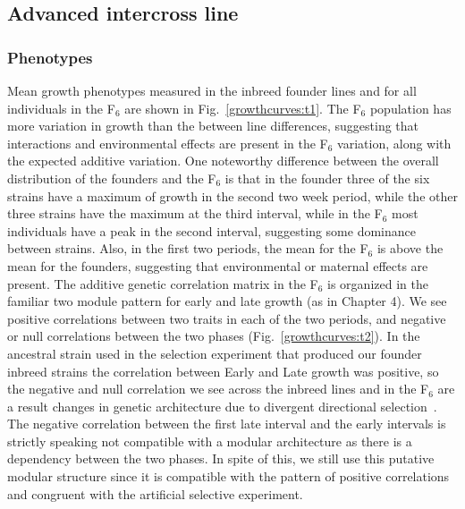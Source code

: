 \begin{refsection}
\subsection{Advanced intercross line}

\subsubsection{Phenotypes}

Mean growth phenotypes measured in the inbreed founder lines and for all
individuals in the F$_{\text{6}}$ are shown in Fig.~\ref{growthcurves:t1}. The
F$_{\text{6}}$ population has more variation in growth than the between line
differences, suggesting that interactions and environmental effects are
present in the F$_{\text{6}}$ variation, along with the expected additive
variation. One noteworthy difference between the overall distribution of the
founders and the F$_{\text{6}}$ is that in the founder three of the six
strains have a maximum of growth in the second two week period, while the
other three strains have the maximum at the third interval, while in the
F$_{\text{6}}$ most individuals have a peak in the second interval, suggesting
some dominance between strains. Also, in the first two periods, the mean for
the F$_{\text{6}}$ is above the mean for the founders, suggesting that
environmental or maternal effects are present. The additive genetic
correlation matrix in the F$_{\text{6}}$ is organized in the familiar two
module pattern for early and late growth (as in Chapter 4). We see positive
correlations between two traits in each of the two periods, and negative or
null correlations between the two phases (Fig.~\ref{growthcurves:t2}). In the
ancestral strain used in the selection experiment that produced our founder
inbreed strains the correlation between Early and Late growth was positive, so
the negative and null correlation we see across the inbreed lines and in the
F$_{\text{6}}$ are a result changes in genetic architecture due to divergent
directional selection~\parencite{Atchley1997-vn}. The negative correlation
between the first late interval and the early intervals is strictly speaking
not compatible with a modular architecture as there is a dependency between
the two phases. In spite of this, we still use this putative modular structure
since it is compatible with the pattern of positive correlations and congruent
with the artificial selective experiment.


\end{refsection}
